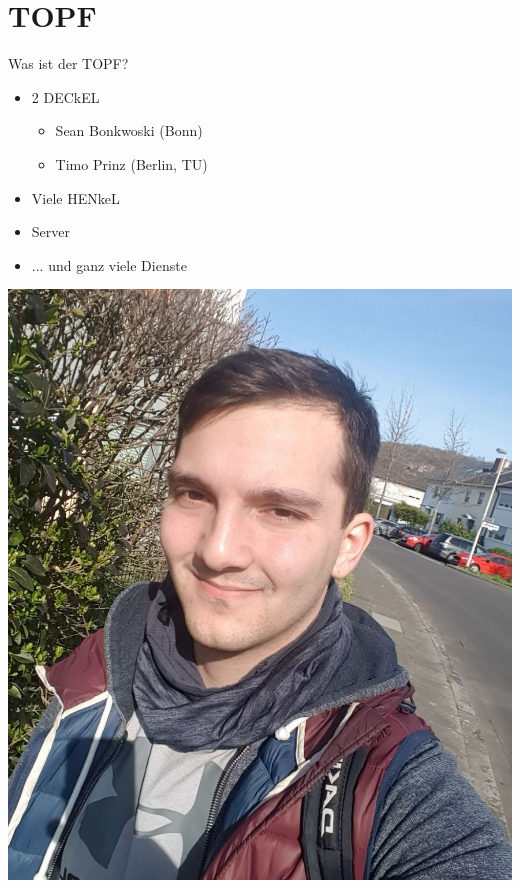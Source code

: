 \documentclass[compress, aspectratio=169]{beamer}
\begin{document}
\section{TOPF}

\begin{frame}{Was ist der TOPF?}
  \begin{minipage}{.5\textwidth}
    \begin{itemize}
      \item 2 DECkEL \footnotemark[1]
      \begin{itemize}
        \item Sean Bonkwoski (Bonn)
        \item Timo Prinz (Berlin, TU)
      \end{itemize}
      \item Viele HENkeL\footnotemark[2]\footnotemark[3]
      \item Server
      \item ... und ganz viele Dienste
    \end{itemize}
  \end{minipage}
  \hfill
  \begin{minipage}{.48\textwidth}
    \begin{minipage}[c]{.5\textwidth}
      \includegraphics[height=.4\textheight]{sean.jpg}

\end{minipage}
\end{minipage}
\end{frame}
\end{document}
